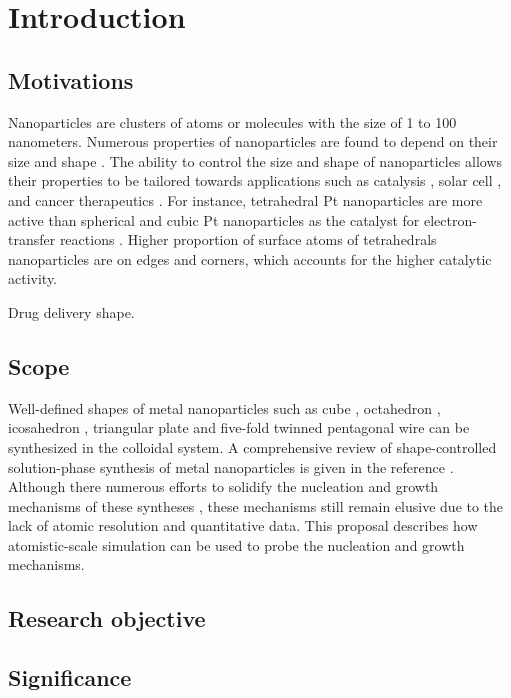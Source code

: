 \section{Introduction}

\subsection{Motivations}

Nanoparticles are clusters of atoms or molecules with the size of 1 to 100 nanometers. Numerous properties of nanoparticles are found to depend on their size \cite{Roduner_2006} and shape \cite{Xia_2008}. The ability to control the size and shape of nanoparticles allows their properties to be tailored towards applications such as catalysis \cite{astruc2008nanoparticles,Astruc_2006}, solar cell \cite{Atwater_2010}, and cancer therapeutics \cite{Jain_2010,Kim_2010}. For instance, tetrahedral Pt nanoparticles are more active than spherical and cubic Pt nanoparticles as the catalyst for electron-transfer reactions \cite{Narayanan_2005}. Higher proportion of surface atoms of tetrahedrals nanoparticles are on edges and corners, which accounts for the higher catalytic activity. 

Drug delivery shape.

\subsection{Scope}

Well-defined shapes of metal nanoparticles such as cube \cite{Im_2005}, octahedron \cite{Xia_2012}, icosahedron \cite{Xiong_2007}, triangular plate \cite{Lofton_2005} and five-fold twinned pentagonal wire \cite{Tsuji_2008} can be synthesized in the colloidal system. A comprehensive review of shape-controlled solution-phase synthesis of metal nanoparticles is given in the reference \cite{Xia_2008}. Although there numerous efforts to solidify the nucleation and growth mechanisms of these syntheses \cite{Lofton_2005,Mariscal_2012,Park_2013,Viswanath_2009,Liao_2014,Chang_2011,Murph_2015}, these mechanisms still remain elusive due to the lack of atomic resolution and quantitative data. This proposal describes how atomistic-scale simulation can be used to probe the nucleation and growth mechanisms.

\subsection{Research objective}

\subsection{Significance}
